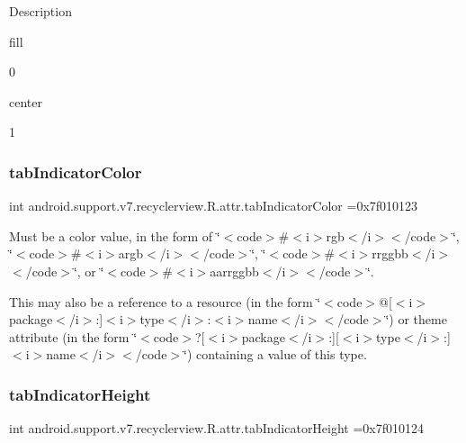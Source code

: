 Description 

{\ttfamily fill}

0

{\ttfamily center}

1\mbox{\label{classandroid_1_1support_1_1v7_1_1recyclerview_1_1R_1_1attr_ae9184a6bb592c6fe2947aead01de41b5}} 
\subsubsection{\texorpdfstring{tab\+Indicator\+Color}{tabIndicatorColor}}
{\footnotesize\ttfamily int android.\+support.\+v7.\+recyclerview.\+R.\+attr.\+tab\+Indicator\+Color =0x7f010123\hspace{0.3cm}{\ttfamily [static]}}

Must be a color value, in the form of \char`\"{}$<$code$>$\#$<$i$>$rgb$<$/i$>$$<$/code$>$\char`\"{}, \char`\"{}$<$code$>$\#$<$i$>$argb$<$/i$>$$<$/code$>$\char`\"{}, \char`\"{}$<$code$>$\#$<$i$>$rrggbb$<$/i$>$$<$/code$>$\char`\"{}, or \char`\"{}$<$code$>$\#$<$i$>$aarrggbb$<$/i$>$$<$/code$>$\char`\"{}. 

This may also be a reference to a resource (in the form \char`\"{}$<$code$>$@\mbox{[}$<$i$>$package$<$/i$>$\+:\mbox{]}$<$i$>$type$<$/i$>$\+:$<$i$>$name$<$/i$>$$<$/code$>$\char`\"{}) or theme attribute (in the form \char`\"{}$<$code$>$?\mbox{[}$<$i$>$package$<$/i$>$\+:\mbox{]}\mbox{[}$<$i$>$type$<$/i$>$\+:\mbox{]}$<$i$>$name$<$/i$>$$<$/code$>$\char`\"{}) containing a value of this type. \mbox{\label{classandroid_1_1support_1_1v7_1_1recyclerview_1_1R_1_1attr_ab36f411b03ace9682389cb9d40b8dcb3}} 
\subsubsection{\texorpdfstring{tab\+Indicator\+Height}{tabIndicatorHeight}}
{\footnotesize\ttfamily int android.\+support.\+v7.\+recyclerview.\+R.\+attr.\+tab\+Indicator\+Height =0x7f010124\hspace{0.3cm}{\ttfamily [static]}}


